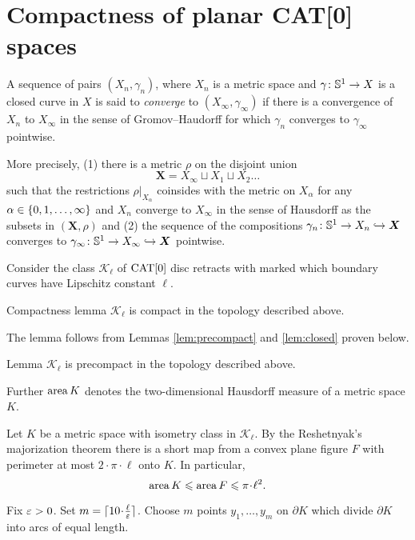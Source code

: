 \section{Compactness of planar CAT[0] spaces}\label{Compactness}

A sequence of pairs $(X_n,\gamma_n)$, where $X_n$ is a metric space and $\gamma\colon\mathbb{S}^1\to X$ is a closed curve in $X$ is said to \emph{converge} to $(X_\infty,\gamma_\infty)$ if there is a convergence of $X_n$ to $X_\infty$ in the sense of Gromov--Haudorff for which $\gamma_n$ converges to $\gamma_\infty$ pointwise.

More precisely, (1) there is a metric $\rho$ on the disjoint union 
\[\bm{X}=X_\infty\sqcup X_1\sqcup X_2\dots\]
such that the restrictions $\rho|_{X_\alpha}$ coinsides with the metric on $X_\alpha$ for any $\alpha\zz\in\{0,1,\dots,\infty\}$ and $X_n$ converge to $X_\infty$ in the sense of Hausdorff as the subsets in $(\bm{X},\rho)$ and (2) the sequence of the compositions $\gamma_n\colon\mathbb{S}^1\to X_n \hookrightarrow\bm{X}$ converges to $\gamma_\infty\colon\mathbb{S}^1\to X_\infty \hookrightarrow\bm{X}$ pointwise.

Consider the class $\mathcal{K}_\ell$ of $\mathop{\rm CAT}\nolimits[0]$ disc retracts with marked
which boundary curves have Lipschitz constant $\ell$.


\begin{thm}{Compactness lemma}\label{lem:compact}
$\mathcal{K}_\ell$ is compact in the topology described above.
\end{thm}

The lemma follows from Lemmas \ref{lem:precompact} and \ref{lem:closed} proven below.

\begin{thm}{Lemma}\label{lem:precompact}
$\mathcal{K}_\ell$ is precompact in the topology described above.
\end{thm}

Further $\mathop{\rm area}\nolimits K$ denotes the two-dimensional Hausdorff measure of a metric space $K$. 

Let $K$ be a metric space with isometry class in $\mathcal {K}_\ell$.
By the Reshetnyak's majorization theorem there is a short map from a convex plane figure $F$ with perimeter at most $2\cdot\pi\cdot \ell$ onto $K$. %
In particular, 
\[\area K \le \area F \le \pi\cdot\ell^2.\]

Fix $\varepsilon>0$. 
Set $m=\lceil 10\cdot\tfrac\ell\eps\rceil$.
Choose $m$ points $y_1,\dots,y_m$ on $\partial K$
which divide $\partial K$ into arcs of equal length.

